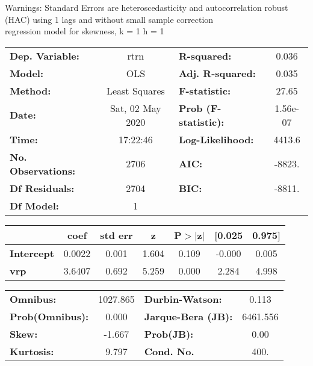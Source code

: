 Warnings: \newline
 [1] Standard Errors are heteroscedasticity and autocorrelation robust (HAC) using 1 lags and without small sample correction\\ 

regression model for skewness, k = 1 h = 1\begin{center}
\begin{tabular}{lclc}
\toprule
\textbf{Dep. Variable:}    &       rtrn       & \textbf{  R-squared:         } &     0.036   \\
\textbf{Model:}            &       OLS        & \textbf{  Adj. R-squared:    } &     0.035   \\
\textbf{Method:}           &  Least Squares   & \textbf{  F-statistic:       } &     27.65   \\
\textbf{Date:}             & Sat, 02 May 2020 & \textbf{  Prob (F-statistic):} &  1.56e-07   \\
\textbf{Time:}             &     17:22:46     & \textbf{  Log-Likelihood:    } &    4413.6   \\
\textbf{No. Observations:} &        2706      & \textbf{  AIC:               } &    -8823.   \\
\textbf{Df Residuals:}     &        2704      & \textbf{  BIC:               } &    -8811.   \\
\textbf{Df Model:}         &           1      & \textbf{                     } &             \\
\bottomrule
\end{tabular}
\begin{tabular}{lcccccc}
                   & \textbf{coef} & \textbf{std err} & \textbf{z} & \textbf{P$> |$z$|$} & \textbf{[0.025} & \textbf{0.975]}  \\
\midrule
\textbf{Intercept} &       0.0022  &        0.001     &     1.604  &         0.109        &       -0.000    &        0.005     \\
\textbf{vrp}       &       3.6407  &        0.692     &     5.259  &         0.000        &        2.284    &        4.998     \\
\bottomrule
\end{tabular}
\begin{tabular}{lclc}
\textbf{Omnibus:}       & 1027.865 & \textbf{  Durbin-Watson:     } &    0.113  \\
\textbf{Prob(Omnibus):} &   0.000  & \textbf{  Jarque-Bera (JB):  } & 6461.556  \\
\textbf{Skew:}          &  -1.667  & \textbf{  Prob(JB):          } &     0.00  \\
\textbf{Kurtosis:}      &   9.797  & \textbf{  Cond. No.          } &     400.  \\
\bottomrule
\end{tabular}
\end{center}

